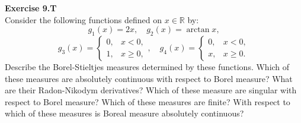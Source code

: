 \documentclass[12pt, a4paper]{article}
\theoremstyle{plain}
\newcommand{\R}{\mathbb{R}}
\newenvironment{exercise}[2][Exercise]
    { \begin{mdframed}[backgroundcolor=gray!20] \textbf{#1 #2} \\}
    {  \end{mdframed}}
\begin{document}
\pagebreak

\begin{exercise}{9.T}
    Consider the following functions defined on $x\in\R$ by:
    \[
    g_1(x)=2x, \quad g_2(x)=\arctan x, 
    \]
    \[
    g_3(x) = \begin{cases}
        0, &x<0,\\
        1, &x\geq 0,
    \end{cases},\quad g_4(x) = \begin{cases}
        0, &x<0,\\
        x, &x\geq 0.
        \end{cases}
    \]
    Describe the Borel-Stieltjes measures determined by these functions. Which of these measures are absolutely continuous with respect to Borel measure? What are their Radon-Nikodym derivatives? Which of these measure are singular with respect to Borel measure? Which of these measures are finite? With respect to which of these measures is Boreal measure absolutely continuous?
\end{exercise}
\end{document}
